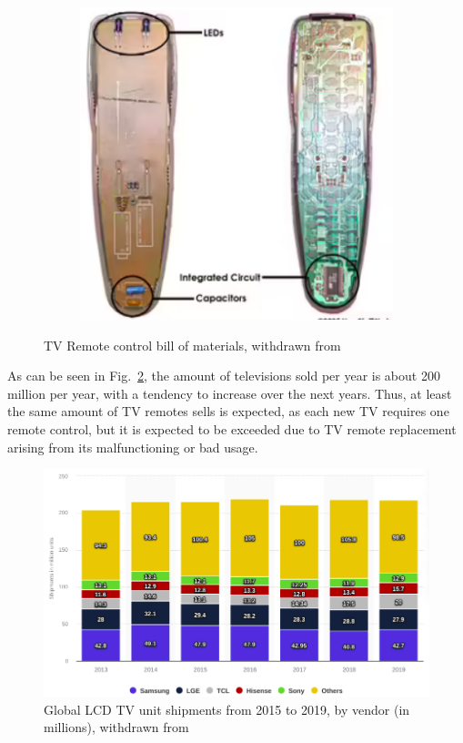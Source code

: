 \begin{figure}[htb!]
\begin{subfigure}{.4\textwidth}
    \includegraphics[width=\textwidth]{img/remotematerial2.png}%
\end{subfigure}
%
  \caption{TV Remote control bill of materials, withdrawn from~\cite{remotematerial}}%
  \label{fig:remotemat}
\end{figure}

As can be seen in Fig.~\ref{fig:tvsells}, the amount of televisions sold per
year is about 200 million per year, with a tendency to increase over the next
years. Thus, at least the same amount of TV remotes sells is expected, as each
new TV requires one remote control, but it is expected to be exceeded due to TV
remote replacement arising from its malfunctioning or bad usage.
%
\begin{figure}[htb!]
\centering
    \includegraphics[width=0.7\columnwidth]{./img/tvsellings.png}
  \caption{Global LCD TV unit shipments from 2015 to 2019, by vendor (in
    millions), withdrawn from~\cite{tvsellings}}%
\label{fig:tvsells}
\end{figure}
%

